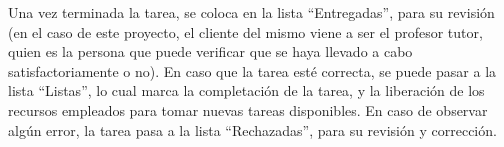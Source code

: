 Una vez terminada la tarea, se coloca en la lista ``Entregadas'', para su revisión (en el caso de este proyecto, el cliente del mismo viene a ser el profesor tutor, quien es la persona que puede verificar que se haya llevado a cabo satisfactoriamente o no). En caso que la tarea esté correcta, se puede pasar a la lista ``Listas'', lo cual marca la completación de la tarea, y la liberación de los recursos empleados para tomar nuevas tareas disponibles. En caso de observar algún error, la tarea pasa a la lista ``Rechazadas'', para su revisión y corrección.
